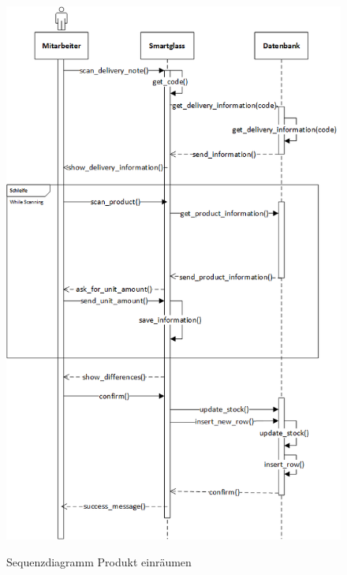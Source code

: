 \begin{figure}[H]
	\centering
	{\includegraphics[scale=0.75]{Bilder/Abbildungen/SMAR_warenannahme_Sequenzdiagramm.png}}
	\caption{Sequenzdiagramm Produkt einräumen}
	\label{fig:sequenz_warenannnahme}
\end{figure}

